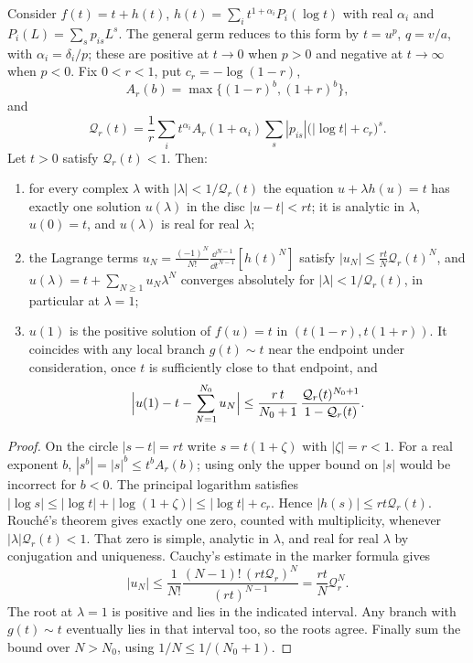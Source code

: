 \begin{theorem}
\label{thm:majorant}
Consider $f(t)=t+h(t)$, $h(t)=\sum_it^{1+\alpha_i}P_i(\log t)$ with real $\alpha_i$ and $P_i(L)=\sum_sp_{is}L^s$. The general germ reduces to this form by $t=u^p$, $q=v/a$, with $\alpha_i=\delta_i/p$; these are positive at $t\to0$ when $p>0$ and negative at $t\to\infty$ when $p<0$. Fix $0<r<1$, put $c_r=-\log(1-r)$,
\[
 A_r(b)=\max\{(1-r)^b,(1+r)^b\},
\]
and
\begin{equation}
 \mathcal Q_r(t)=\frac1r\sum_it^{\alpha_i}A_r(1+\alpha_i)\sum_s|p_{is}|\bigl(|\log t|+c_r\bigr)^s .
 \label{eq:Qr}
\end{equation}
Let $t>0$ satisfy $\mathcal Q_r(t)<1$. Then:
\begin{enumerate}[leftmargin=1.8em]
\item for every complex $\lambda$ with $|\lambda|<1/\mathcal Q_r(t)$ the equation $u+\lambda h(u)=t$ has exactly one solution $u(\lambda)$ in the disc $|u-t|<rt$; it is analytic in $\lambda$, $u(0)=t$, and $u(\lambda)$ is real for real $\lambda$;
\item the Lagrange terms $u_N=\frac{(-1)^N}{N!}\frac{\dd^{N-1}}{\dd t^{N-1}}[h(t)^N]$ satisfy $|u_N|\le\frac{rt}{N}\mathcal Q_r(t)^N$, and $u(\lambda)=t+\sum_{N\ge1}u_N\lambda^N$ converges absolutely for $|\lambda|<1/\mathcal Q_r(t)$, in particular at $\lambda=1$;
\item $u(1)$ is the positive solution of $f(u)=t$ in $(t(1-r),t(1+r))$. It coincides with any local branch $g(t)\sim t$ near the endpoint under consideration, once $t$ is sufficiently close to that endpoint, and
\begin{equation}
 \Bigl|u(1)-t-\sum_{N=1}^{N_0}u_N\Bigr|\le\frac{r\,t}{N_0+1}\,\frac{\mathcal Q_r(t)^{N_0+1}}{1-\mathcal Q_r(t)} .
 \label{eq:tail-bound}
\end{equation}
\end{enumerate}
\end{theorem}
\begin{proof}
On the circle $|s-t|=rt$ write $s=t(1+\zeta)$ with $|\zeta|=r<1$. For a real exponent $b$, $|s^b|=|s|^b\le t^b A_r(b)$; using only the upper bound on $|s|$ would be incorrect for $b<0$. The principal logarithm satisfies $|\log s|\le|\log t|+|\log(1+\zeta)|\le|\log t|+c_r$. Hence $|h(s)|\le rt\mathcal Q_r(t)$. Rouch\'e's theorem gives exactly one zero, counted with multiplicity, whenever $|\lambda|\mathcal Q_r(t)<1$. That zero is simple, analytic in $\lambda$, and real for real $\lambda$ by conjugation and uniqueness. Cauchy's estimate in the marker formula gives
\[
 |u_N|\le\frac1{N!}\frac{(N-1)!\,(rt\mathcal Q_r)^N}{(rt)^{N-1}}=\frac{rt}{N}\mathcal Q_r^N.
\]
The root at $\lambda=1$ is positive and lies in the indicated interval. Any branch with $g(t)\sim t$ eventually lies in that interval too, so the roots agree. Finally sum the bound over $N>N_0$, using $1/N\le1/(N_0+1)$.
\end{proof}

